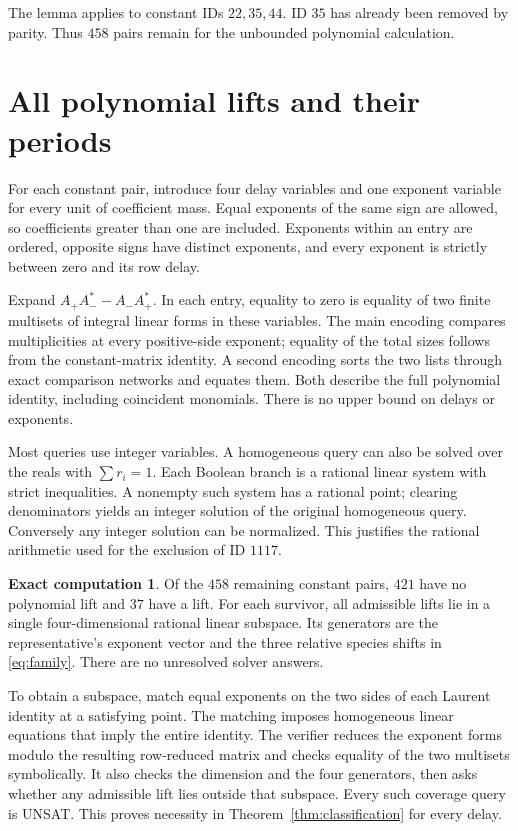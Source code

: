 \documentclass[11pt,a4paper]{article}
\theoremstyle{definition}
\newtheorem{computation}[theorem]{Exact computation}
\begin{document}
The lemma applies to constant IDs $22,35,44$. ID $35$ has already been
removed by parity. Thus $458$ pairs remain for the unbounded polynomial
calculation.

\section{All polynomial lifts and their periods}\label{sec:lifts}
For each constant pair, introduce four delay variables and one exponent
variable for every unit of coefficient mass. Equal exponents of the same
sign are allowed, so coefficients greater than one are included. Exponents
within an entry are ordered, opposite signs have distinct exponents, and
every exponent is strictly between zero and its row delay.

Expand $A_+A_-^*-A_-A_+^*$. In each entry, equality to zero is equality of
two finite multisets of integral linear forms in these variables. The main
encoding compares multiplicities at every positive-side exponent; equality
of the total sizes follows from the constant-matrix identity. A second
encoding sorts the two lists through exact comparison networks and equates
them. Both describe the full polynomial identity, including coincident
monomials. There is no upper bound on delays or exponents.

Most queries use integer variables. A homogeneous query can also be solved
over the reals with $\sum r_i=1$. Each Boolean branch is a rational linear
system with strict inequalities. A nonempty such system has a rational
point; clearing denominators yields an integer solution of the original
homogeneous query. Conversely any integer solution can be normalized.
This justifies the rational arithmetic used for the exclusion of ID $1117$.

\begin{computation}\label{comp:lifts}
Of the $458$ remaining constant pairs, $421$ have no polynomial lift and
$37$ have a lift. For each survivor, all admissible lifts lie in a single
four-dimensional rational linear subspace. Its generators are the
representative's exponent vector and the three relative species shifts in
\eqref{eq:family}. There are no unresolved solver answers.
\end{computation}

To obtain a subspace, match equal exponents on the two sides of each Laurent
identity at a satisfying point. The matching imposes homogeneous linear
equations that imply the entire identity. The verifier reduces the exponent
forms modulo the resulting row-reduced matrix and checks equality of the
two multisets symbolically. It also checks the dimension and the four
generators, then asks whether any admissible lift lies outside that subspace.
Every such coverage query is UNSAT. This proves necessity in
Theorem~\ref{thm:classification} for every delay.
\end{document}
